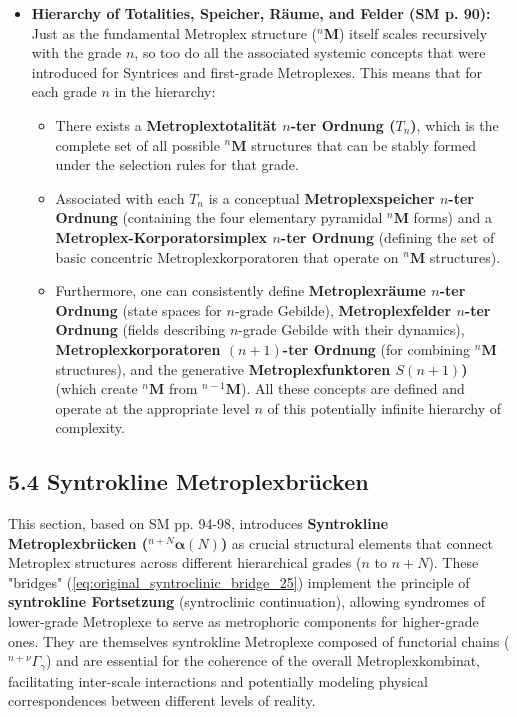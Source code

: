 \documentclass[12pt]{article}
\newcommand{\metroplex}[1]{{}^{#1}\mathbf{M}}
\newcommand{\metroplextotalitaet}[1]{T_{#1}}
\newcommand{\metroplexfunktor}{S}
\newcommand{\syntroklinebruecke}[1]{{}^{#1}\bm{\alpha}}
\begin{document}
\begin{itemize}
    \item \textbf{Hierarchy of Totalities, Speicher, Räume, and Felder (SM p. 90):}
    Just as the fundamental Metroplex structure (\( \metroplex{n} \)) itself scales recursively with the grade \( n \), so too do all the associated systemic concepts that were introduced for Syntrices and first-grade Metroplexes. This means that for each grade \( n \) in the hierarchy:
    \begin{itemize}
        \item There exists a \textbf{Metroplextotalität \( n \)-ter Ordnung (\( \metroplextotalitaet{n} \))}, which is the complete set of all possible \( \metroplex{n} \) structures that can be stably formed under the selection rules for that grade.
        \item Associated with each \( \metroplextotalitaet{n} \) is a conceptual \textbf{Metroplexspeicher \( n \)-ter Ordnung} (containing the four elementary pyramidal \( \metroplex{n} \) forms) and a \textbf{Metroplex-Korporatorsimplex \( n \)-ter Ordnung} (defining the set of basic concentric Metroplexkorporatoren that operate on \( \metroplex{n} \) structures).
        \item Furthermore, one can consistently define \textbf{Metroplexräume \( n \)-ter Ordnung} (state spaces for \(n\)-grade Gebilde), \textbf{Metroplexfelder \( n \)-ter Ordnung} (fields describing \(n\)-grade Gebilde with their dynamics), \textbf{Metroplexkorporatoren \( (n+1) \)-ter Ordnung} (for combining \( \metroplex{n} \) structures), and the generative \textbf{Metroplexfunktoren \( \metroplexfunktor(n+1) \))} (which create \( \metroplex{n} \) from \( \metroplex{n-1} \)). All these concepts are defined and operate at the appropriate level \( n \) of this potentially infinite hierarchy of complexity.
    \end{itemize}
\end{itemize}

\subsection{5.4 Syntrokline Metroplexbrücken}
\label{sec:metroplex_bridges}

This section, based on SM pp. 94-98, introduces \textbf{Syntrokline Metroplexbrücken (\(\syntroklinebruecke{n+N}(N)\))} as crucial structural elements that connect Metroplex structures across different hierarchical grades (\(n\) to \(n+N\)). These "bridges" (\eqref{eq:original_syntroclinic_bridge_25}) implement the principle of \textbf{syntrokline Fortsetzung} (syntroclinic continuation), allowing syndromes of lower-grade Metroplexe to serve as metrophoric components for higher-grade ones. They are themselves syntrokline Metroplexe composed of functorial chains (\( {}^{n+\nu}\Gamma_\gamma \)) and are essential for the coherence of the overall Metroplexkombinat, facilitating inter-scale interactions and potentially modeling physical correspondences between different levels of reality.
\end{document}
